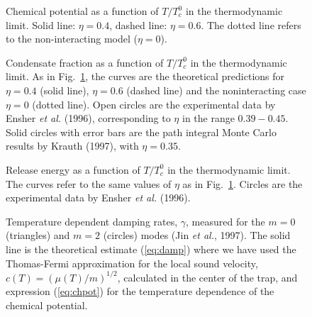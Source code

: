\bigskip

\begin{figure}[t]
\epsfysize=8cm
\hspace{3cm}
\caption{Chemical potential as a function of $T/T_c^0$ in the 
thermodynamic  limit.  Solid line: $\eta=0.4$, dashed line: $\eta=0.6$.
The dotted line refers to the non-interacting model ($\eta=0$).} 
\label{fig:s-mu}
\end{figure}

\bigskip

\begin{figure}[t]
\epsfysize=8cm
\hspace{3cm}
\caption{Condensate fraction as a function of $T/T_c^0$ in the 
thermodynamic limit. As in Fig.~\protect\ref{fig:s-mu}, the curves 
are the theoretical predictions for $\eta=0.4$ (solid line), 
$\eta=0.6$ (dashed line) and the noninteracting case $\eta=0$
(dotted line).  Open circles are the experimental data by Ensher 
{\it et al.} (1996), corresponding to $\eta$ in the range 
$0.39-0.45$.  Solid circles with error bars are the path
integral Monte Carlo results by Krauth (1997), with $\eta=0.35$. } 
\label{fig:s-condfrac2}
\end{figure}

\bigskip

\begin{figure}[t]
\epsfysize=8cm
\hspace{3cm}
\caption{Release energy as a function of $T/T_c^0$ in the 
thermodynamic limit. The curves refer to the same values of $\eta$ 
as in  Fig.~\protect\ref{fig:s-mu}.  Circles are the experimental 
data by Ensher {\it et al.} (1996).} 
\label{fig:s-release}
\end{figure}

\bigskip

\begin{figure}[t]
\epsfysize=8cm
\hspace{3cm}
\caption{Temperature dependent damping rates, $\gamma$, measured 
for the $m=0$ (triangles) and $m=2$ (circles) modes (Jin {\it et al.}, 
1997). The solid line is the theoretical estimate (\protect\ref{eq:damp})
where we have used the Thomas-Fermi approximation for the local sound 
velocity, $c(T)=(\mu(T)/m)^{1/2}$, calculated in the center 
of the trap,  and expression (\protect\ref{eq:chpot}) for the temperature 
dependence  of the chemical potential.  } 
\label{fig:damping}
\end{figure}

